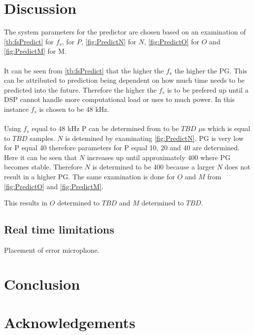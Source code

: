 \section{Discussion}

The system parameters for the predictor are chosen based on an examination of \autoref{tb:fsPredict} for $f_s$,  for $P$, \autoref{fig:PredictN} for $N$, \autoref{fig:PredictO} for $O$ and \autoref{fig:PredictM} for M.
\\\\
It can be seen from \autoref{tb:fsPredict} that the higher the $f_s$ the higher the PG. This can be attributed to prediction being dependent on how much time needs to be predicted into the future. 
Therefore the higher the $f_s$ is to be prefered up until a DSP cannot handle more computational load or uses to much power. In this instance $f_s$ is chosen to be $48$ kHz. 
\\\\
Using $f_s$ equal to $48$ kHz P can be determined from  to be $TBD$ $\mu$s which is equal to $TBD$ samples. $N$ is detemined by examinating \autoref{fig:PredictN}. PG is very low for P equal 40 therefore parameters for P equal 10, 20 and 40 are determined. Here it can be seen that $N$ increases up until approximately $400$ where PG becomes stable. Therefore $N$ is determined to be $400$ because a larger $N$ does not result in a higher PG. The same examination is done for $O$ and $M$ from \autoref{fig:PredictO} and \autoref{fig:PredictM}.



This results in $O$ determined to $TBD$ and $M$ determined to $TBD$.   







\subsection*{Real time limitations}
Placement of error microphone.


\section{Conclusion}

\section*{Acknowledgements}
